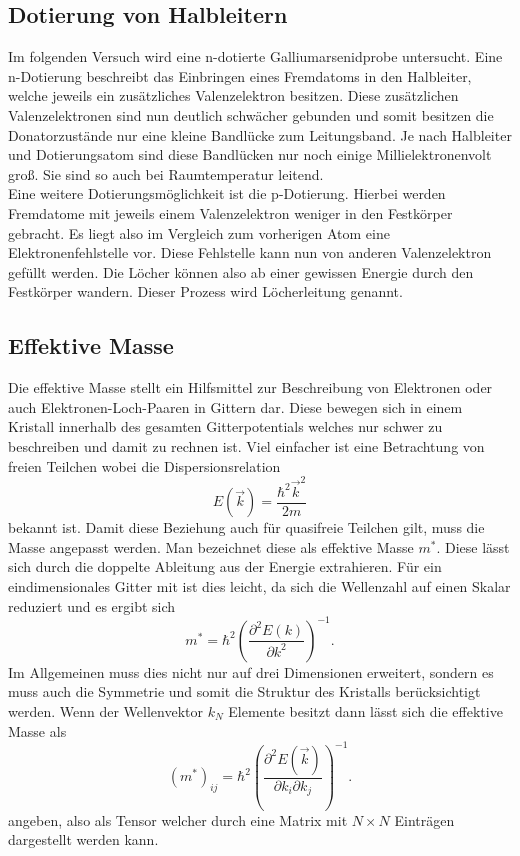 \subsection{Dotierung von Halbleitern}
Im folgenden Versuch wird eine n-dotierte 
Galliumarsenidprobe untersucht. Eine n-Dotierung beschreibt das Einbringen eines Fremdatoms in den Halbleiter, welche jeweils ein zusätzliches Valenzelektron besitzen. Diese
zusätzlichen Valenzelektronen sind nun deutlich schwächer gebunden und somit besitzen die Donatorzustände nur eine kleine Bandlücke zum Leitungsband. Je nach Halbleiter und Dotierungsatom sind
diese Bandlücken nur noch einige Millielektronenvolt groß. Sie sind so auch bei Raumtemperatur leitend.
\\
Eine weitere Dotierungsmöglichkeit ist die p-Dotierung. Hierbei werden Fremdatome mit jeweils einem Valenzelektron weniger in den Festkörper gebracht. Es liegt also im Vergleich zum vorherigen Atom eine Elektronenfehlstelle vor. 
Diese Fehlstelle kann nun von anderen Valenzelektron gefüllt werden. Die Löcher können also ab einer gewissen Energie durch den Festkörper wandern. Dieser Prozess wird Löcherleitung genannt.

\subsection{Effektive Masse}

Die effektive Masse stellt ein Hilfsmittel zur Beschreibung von Elektronen oder auch Elektronen-Loch-Paaren in Gittern dar. Diese bewegen sich in einem Kristall
innerhalb des gesamten Gitterpotentials welches nur schwer zu beschreiben und damit zu rechnen ist. Viel einfacher ist eine Betrachtung von freien Teilchen wobei
die Dispersionsrelation
\begin{equation}
E(\vec{k}) = \frac{\hbar^2 \vec{k}^2}{2m}
\end{equation}
bekannt ist. Damit diese Beziehung auch für quasifreie Teilchen gilt, muss die Masse angepasst werden. Man bezeichnet diese
als effektive Masse $m^*$. Diese lässt sich durch die doppelte Ableitung aus der Energie extrahieren. Für ein eindimensionales Gitter mit ist dies leicht, da
sich die Wellenzahl auf einen Skalar reduziert und es ergibt sich
\begin{equation*}
m^* = \hbar^2 \left( \frac{\partial^2 E(k)}{\partial k^2} \right)^{-1}.
\end{equation*}
Im Allgemeinen muss dies nicht nur auf drei Dimensionen erweitert, sondern es muss auch die Symmetrie und somit die Struktur des Kristalls berücksichtigt werden.
Wenn der Wellenvektor $k_N$ Elemente besitzt dann lässt sich die effektive Masse als 
\begin{equation}
    (m^*)_{ij} = \hbar^2 \left( \frac{\partial^2 E(\vec{k})}{\partial k_i \partial k_j} \right)^{-1}. 
\end{equation}
angeben, also als Tensor welcher durch eine Matrix mit $N \times N$ Einträgen dargestellt werden kann.

